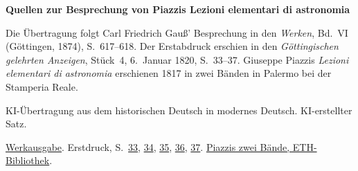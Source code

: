 \clearpage\thispagestyle{empty}
\begin{center}\Large\bfseries Quellen zur Besprechung von Piazzis Lezioni elementari di astronomia\end{center}

Die Übertragung folgt Carl Friedrich Gauß’ Besprechung in den \emph{Werken}, Bd.~VI (Göttingen, 1874), S.~617--618. Der Erstabdruck erschien in den \emph{Göttingischen gelehrten Anzeigen}, Stück~4, 6.~Januar 1820, S.~33--37. Giuseppe Piazzis \emph{Lezioni elementari di astronomia} erschienen 1817 in zwei Bänden in Palermo bei der Stamperia Reale.

KI-Übertragung aus dem historischen Deutsch in modernes Deutsch. KI-erstellter Satz.

\href{https://gdz.sub.uni-goettingen.de/id/PPN236007467}{Werkausgabe}. Erstdruck, S.~\href{https://images.p.sub.uni-goettingen.de/iiif/image/gdz:PPN319721507_1820:00000035/full/1650,/0/default.jpg}{33}, \href{https://images.p.sub.uni-goettingen.de/iiif/image/gdz:PPN319721507_1820:00000036/full/1650,/0/default.jpg}{34}, \href{https://images.p.sub.uni-goettingen.de/iiif/image/gdz:PPN319721507_1820:00000037/full/1650,/0/default.jpg}{35}, \href{https://images.p.sub.uni-goettingen.de/iiif/image/gdz:PPN319721507_1820:00000038/full/1650,/0/default.jpg}{36}, \href{https://images.p.sub.uni-goettingen.de/iiif/image/gdz:PPN319721507_1820:00000039/full/1650,/0/default.jpg}{37}. \href{https://doi.org/10.3931/e-rara-49276}{Piazzis zwei Bände, ETH-Bibliothek}.

\clearpage
